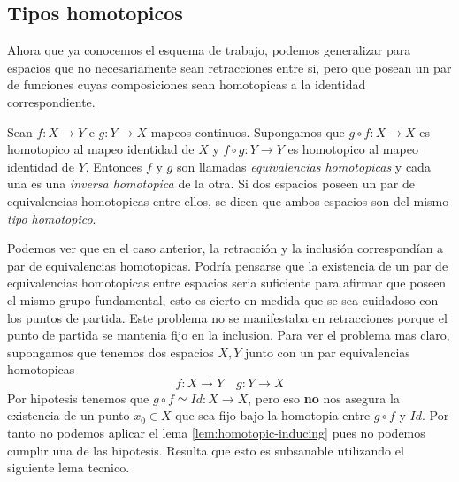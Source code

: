 \subsection{Tipos homotopicos}
Ahora que ya conocemos el esquema de trabajo, podemos generalizar para
espacios que no necesariamente sean retracciones entre si, pero que
posean un par de funciones cuyas composiciones sean homotopicas a la
identidad correspondiente.
\begin{definicion}
  Sean \(f : X \to Y\) e \(g : Y \to X\) mapeos continuos. Supongamos
  que \( g \circ f : X \to X \) es homotopico al mapeo identidad de
  \(X\) y \( f \circ g : Y \to Y \) es homotopico al mapeo identidad de
  \(Y\). Entonces \(f\) y \(g\) son llamadas \emph{equivalencias
  homotopicas} y cada una es una \emph{inversa homotopica} de la otra.
  Si dos espacios poseen un par de equivalencias homotopicas entre ellos,
  se dicen que ambos espacios son del mismo \emph{tipo homotopico}.
\end{definicion}
Podemos ver que en el caso anterior, la retracción y la inclusión
correspondían a par de equivalencias homotopicas. Podría pensarse que la
existencia de un par de equivalencias homotopicas entre espacios seria
suficiente para afirmar que poseen el mismo grupo fundamental, esto es
cierto en medida que se sea cuidadoso con los puntos de partida. Este
problema no se manifestaba en retracciones porque el punto de partida se
mantenia fijo en la inclusion. Para ver el problema mas claro,
supongamos que tenemos dos espacios \(X, Y\) junto con un par
equivalencias homotopicas
\[ f : X \to Y \quad g : Y \to X \]
Por hipotesis tenemos que \(g \circ f \simeq Id : X \to X\), pero eso
\textbf{no} nos asegura la existencia de un punto \(x_0 \in X\) que sea
fijo bajo la homotopia entre \( g \circ f\) y \(Id\). Por tanto no
podemos aplicar el lema \ref{lem:homotopic-inducing} pues no podemos
cumplir una de las hipotesis. Resulta que esto es subsanable utilizando
el siguiente lema tecnico.

